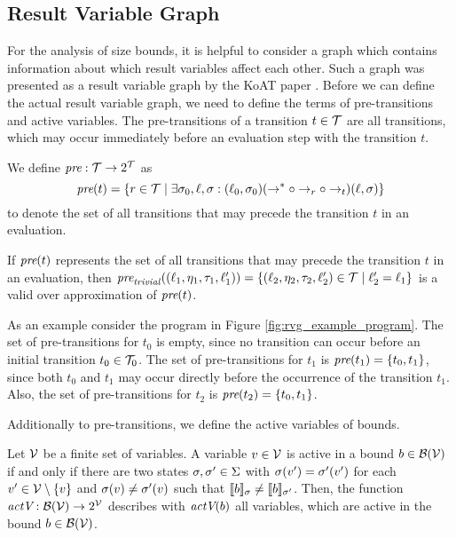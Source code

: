 \subsection{Result Variable Graph}

For the analysis of size bounds, it is helpful to consider a graph which contains information about which result variables affect each other.
Such a graph was presented as a result variable graph by the KoAT paper \cite{koat}.
Before we can define the actual result variable graph, we need to define the terms of pre-transitions and active variables.
The pre-transitions of a transition $t \in \mathcal{T}$ are all transitions, which may occur immediately before an evaluation step with the transition $t$.

\begin{definition} 
  We define $\emph{pre}: \mathcal{T} \rightarrow 2^{\mathcal{T}}$ as
  \[\emph{pre}(t) = \lbrace r \in \mathcal{T} \mid \exists \sigma_0, \ell, \sigma: (\ell_0, \sigma_0) (\rightarrow^* \circ \rightarrow_r \circ \rightarrow_{t}) (\ell, \sigma) \rbrace\]
  to denote the set of all transitions that may precede the transition $t$ in an evaluation.	
\end{definition}

If $\emph{pre}(t)$ represents the set of all transitions that may precede the transition $t$ in an evaluation, then $\emph{pre}_{\mathit{trivial}}((\ell_1, \eta_1, \tau_1, \ell_1')) = \lbrace (\ell_2, \eta_2, \tau_2, \ell_2') \in \mathcal{T} \mid \ell_2' = \ell_1 \rbrace$ is a valid over approximation of $\emph{pre}(t)$.



As an example consider the program in Figure \ref{fig:rvg_example_program}.
The set of pre-transitions for $t_0$ is empty, since no transition can occur before an initial transition $t_0 \in \mathcal{T}_0$.
The set of pre-transitions for $t_1$ is $\emph{pre}(t_1) = \lbrace t_0, t_1 \rbrace$, since both $t_0$ and $t_1$ may occur directly before the occurrence of the transition $t_1$.
Also, the set of pre-transitions for $t_2$ is $\emph{pre}(t_2) = \lbrace t_0, t_1 \rbrace$.

Additionally to pre-transitions, we define the active variables of bounds. 

\begin{definition}
  Let $\mathcal{V}$ be a finite set of variables.  
  A variable $v \in \mathcal{V}$ is active in a bound $b \in \mathcal{B}(\mathcal{V})$ if and only if there are two states $\sigma, \sigma' \in \Sigma$ with $\sigma(v') = \sigma'(v')$ for each $v' \in \mathcal{V} \setminus \lbrace v \rbrace$ and $\sigma(v) \neq \sigma'(v)$ such that $\llbracket b \rrbracket_{\sigma} \neq \llbracket b \rrbracket_{\sigma'}$.
  Then, the function $\emph{actV}: \mathcal{B}(\mathcal{V}) \rightarrow 2^{\mathcal{V}}$ describes with $\emph{actV}(b)$ all variables, which are active in the bound $b \in \mathcal{B}(\mathcal{V})$.
\end{definition}

